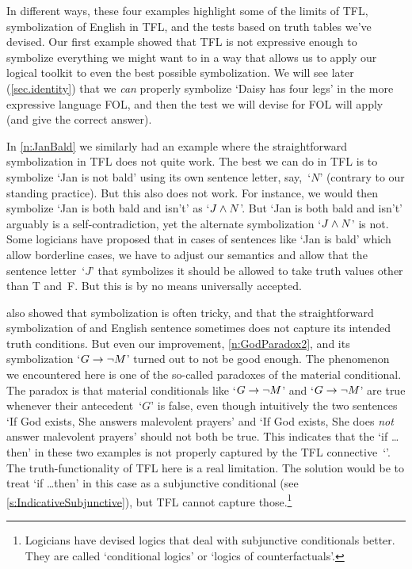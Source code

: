 In different ways, these four examples highlight some of the limits of
TFL, symbolization of English in TFL, and the tests based on truth
tables we've devised. Our first example showed that TFL is not
expressive enough to symbolize everything we might want to in a way
that allows us to apply our logical toolkit to even the best possible
symbolization. We will see later (\cref{sec.identity}) that we
\emph{can} properly symbolize `Daisy has four legs' in the more
expressive language FOL, and then the test we will devise for FOL will
apply (and give the correct answer).

In \cref{n:JanBald} we similarly had an example where the
straightforward symbolization in TFL does not quite work. The best we
can do in TFL is to symbolize `Jan is not bald' using its own sentence
letter, say,~`$N$' (contrary to our standing practice). But this also
does not work. For instance, we would then symbolize `Jan is both bald
and isn't' as `$J \wedge N$'. But `Jan is both bald and isn't' arguably
is a self-contradiction, yet the alternate symbolization `$J \wedge N$'
is not. Some logicians have proposed that in cases of sentences like
`Jan is bald' which allow borderline cases, we have to adjust our
semantics and allow that the sentence letter~`$J$' that symbolizes it
should be allowed to take truth values other than T and~F. But this is
by no means universally accepted.

 also showed that symbolization is often tricky,
and that the straightforward symbolization of and English sentence
sometimes does not capture its intended truth conditions. But even our
improvement, \cref{n:GodParadox2}, and its symbolization `$G \rightarrow
\neg M$' turned out to not be good enough. The phenomenon we
encountered here is one of the so-called paradoxes of the material
conditional. The paradox is that material conditionals like `$G \rightarrow
\neg M$' and `$G \rightarrow \neg M$' are true whenever their
antecedent~`$G$' is false, even though intuitively the two sentences
`If God exists, She answers malevolent prayers' and `If God exists,
She does \emph{not} answer malevolent prayers' should not both be true. This
indicates that the `if \dots then' in these two examples is not
properly captured by the TFL connective~`\eif'. The
truth-functionality of TFL here is a real limitation. The solution
would be to treat `if \dots then' in this case as a subjunctive
conditional (see \cref{s:IndicativeSubjunctive}), but TFL cannot
capture those.\footnote{Logicians have devised logics that deal with
subjunctive conditionals better. They are called `conditional logics'
or `logics of counterfactuals'.}

